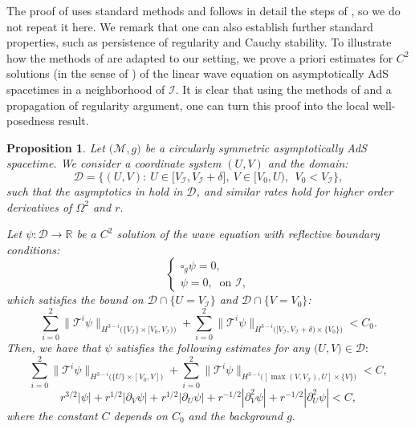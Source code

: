 \documentclass[11pt]{article}
\newtheorem{proposition}{Proposition}[section]
\numberwithin{equation}{section}
\begin{document}
The proof of  uses standard methods and follows in detail the steps of \cite{localwellposed}, so we do not repeat it here. We remark that one can also establish further standard properties, such as persistence of regularity and Cauchy stability. To illustrate how the methods of \cite{localwellposed} are adapted to our setting, we prove a priori estimates for $C^2$ solutions (in the sense of ) of the linear wave equation on asymptotically AdS spacetimes in a neighborhood of $\mathcal{I}$. It is clear that using the methods of \cite{localwellposed} and a propagation of regularity argument, one can turn this proof into the local well-posedness result.

\begin{proposition}\label{proposition linear wave on asympt ads}
    Let $\big(\mathcal{M},g\big)$ be a circularly symmetric asymptotically AdS spacetime. We consider a coordinate system $(U,V)$ and the domain:
    \[\mathcal{D}=\Big\{(U,V):\ U\in\big[V_{\mathcal{I}},V_{\mathcal{I}}+\delta\big],\ V\in\big[V_0,U\big),\ \ V_0<V_{\mathcal{I}}\Big\},\]
    such that the asymptotics in  hold in $\mathcal{D}$, and similar rates hold for higher order derivatives of $\Omega^2$ and $r.$
    
    Let $\psi:\mathcal{D}\rightarrow\mathbb{R}$ be a $C^2$ solution of the wave equation with reflective boundary conditions:
    \begin{equation}
        \begin{cases}
            \square_{g}\psi=0,\\
            \psi=0,\ \text{ on }\mathcal{I},
        \end{cases}
    \end{equation}
    which satisfies the bound on $\mathcal{D}\cap\big\{U=V_{\mathcal{I}}\big\}$ and $\mathcal{D}\cap\big\{V=V_0\big\}$:
    \begin{equation}
        \sum_{i=0}^2\big\|\mathcal{T}^i\psi\big\|_{H^{3-i}\big(\{V_{\mathcal{I}}\}\times[V_0,V_{\mathcal{I}})\big)}+\sum_{i=0}^2\big\|\mathcal{T}^i\psi\big\|_{H^{3-i}\big([V_{\mathcal{I}},V_{\mathcal{I}}+\delta)\times\{V_0\}\big)}<C_0.
    \end{equation}
    Then, we have that $\psi$ satisfies the following estimates for any $\big(U,V\big)\in\mathcal{D}:$
    \begin{equation}\label{energy apriori estimate lwp}
            \sum_{i=0}^2\big\|\mathcal{T}^i\psi\big\|_{H^{3-i}\big(\{U\}\times[V_0,V]\big)}+\sum_{i=0}^2\big\|\mathcal{T}^i\psi\big\|_{H^{3-i}\big([\max(V,V_{\mathcal{I}}),U]\times\{V\}\big)}<C,
    \end{equation}
    \begin{equation}\label{pointwise apriori estimate lwp}
            r^{3/2}|\psi|+r^{1/2}|\partial_V\psi|+r^{1/2}|\partial_U\psi|+r^{-1/2}|\partial_V^2\psi|+r^{-1/2}|\partial_U^2\psi|<C,
    \end{equation}
    where the constant $C$ depends on $C_0$ and the background $g.$
\end{proposition}
\end{document}
